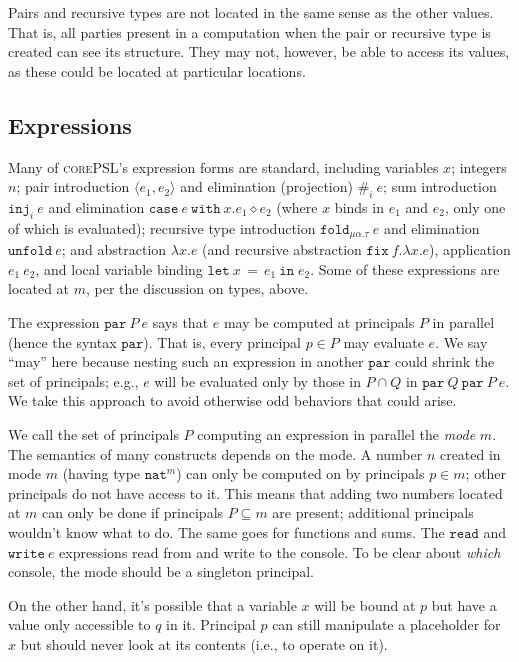 \documentclass[10pt]{article}
\newcommand{\kw}[1]{\ensuremath{\mathtt{#1}}}
\newcommand{\tnat}{\ensuremath{\mathtt{nat}}}
\newcommand{\trec}[2]{\ensuremath{\mu {#1}.{#2}}}
\newcommand{\elet}[3]{\ensuremath{\kw{let}~#1\, =\, #2~\kw{in}\;{#3}}}
\newcommand{\epar}[2]{\ensuremath{\kw{par}~{#1}~{#2}}}
\newcommand{\econd}[3]{\ensuremath{\kw{case}~{#1}~\kw{with}~x.{#2} \diamond {#3}}}
\newcommand{\einj}[2]{\ensuremath{\kw{inj}_{#1}~{#2}}}
\newcommand{\eread}{\ensuremath{\kw{read}}}
\newcommand{\ewrite}[1]{\ensuremath{\kw{write}~{#1}}}
\newcommand{\epair}[2]{\ensuremath{\langle {#1}, {#2} \rangle}}
\newcommand{\eproj}[2]{\ensuremath{\kw{\#}}_{#1}~{#2}}
\newcommand{\elam}[2]{\ensuremath{\lambda {#1}.{#2}}}
\newcommand{\eapp}[2]{\ensuremath{{#1}~{#2}}}
\newcommand{\efix}[3]{\ensuremath{\kw{fix}~{#1}.\elam{#2}{#3}}}
\newcommand{\efold}[2]{\ensuremath{\kw{fold}_{#1}~{#2}}}
\newcommand{\eunfold}[1]{\ensuremath{\kw{unfold}~{#1}}}
\newcommand{\lang}{\textsc{corePSL}\xspace}
\begin{document}
Pairs and recursive types are not located in the same sense as the
other values. That is, all parties present in a computation when the
pair or recursive type is created can see its structure. They may not, however,
be able to access its values, as these could be located at particular
locations.

\subsection{Expressions}

Many of \lang's expression forms are standard, including
variables $x$; integers $n$; pair introduction $\epair{e_1}{e_2}$ and
elimination (projection) $\eproj{i}{e}$; sum introduction
$\einj{i}{e}$ and elimination $\econd{e}{e_1}{e_2}$ (where $x$ binds
in $e_1$ and $e_2$, only one of which is evaluated); recursive type
introduction $\efold{\trec{\alpha}{\tau}}{e}$ and elimination
$\eunfold{e}$; and abstraction $\elam{x}{e}$ (and recursive
abstraction $\efix{f}{x}{e}$), application $\eapp{e_1}{e_2}$, and
local variable binding $\elet{x}{e_1}{e_2}$. Some of these expressions
are located at $m$, per the discussion on types, above.

The expression $\epar{P}{e}$ says that $e$ may be computed at
principals $P$ in parallel (hence the syntax $\kw{par}$). That is,
every principal $p \in P$ may evaluate $e$. We say ``may'' here
because nesting such an expression in another $\kw{par}$ could shrink
the set of principals; e.g., $e$ will be evaluated only by those in
$P \cap Q$ in $\epar{Q}{\epar{P}{e}}$. We take this approach to avoid
otherwise odd behaviors that could arise.

We call the set of principals $P$ computing an expression in parallel
the \emph{mode} $m$. The semantics of many constructs depends on the
mode. A number $n$ created in mode $m$ (having type $\tnat^m$) can
only be computed on by principals $p \in m$; other principals do not
have access to it. This means that adding two numbers located at $m$
can only be done if principals $P \subseteq m$ are present; additional
principals wouldn't know what to do. The same goes for functions and
sums. The $\eread$ and $\ewrite{e}$ expressions read from and write to
the console. To be clear about \emph{which} console, the mode should
be a singleton principal.

On the other hand, it's possible that a variable $x$ will be bound at
$p$ but have a value only accessible to $q$ in it. Principal $p$ can
still manipulate a placeholder for $x$ but should never look at its
contents (i.e., to operate on it).
\end{document}
